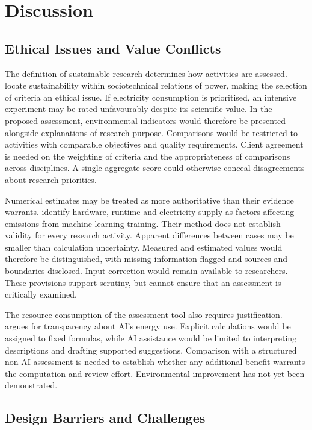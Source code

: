 \documentclass[11pt,a4paper]{article}
\begin{document}
\FloatBarrier
\section{Discussion}

\subsection{Ethical Issues and Value Conflicts}

The definition of sustainable research determines how activities are assessed. \citet{hasselbalch2025sustainability} locate sustainability within sociotechnical relations of power, making the selection of criteria an ethical issue. If electricity consumption is prioritised, an intensive experiment may be rated unfavourably despite its scientific value. In the proposed assessment, environmental indicators would therefore be presented alongside explanations of research purpose. Comparisons would be restricted to activities with comparable objectives and quality requirements. Client agreement is needed on the weighting of criteria and the appropriateness of comparisons across disciplines. A single aggregate score could otherwise conceal disagreements about research priorities.

Numerical estimates may be treated as more authoritative than their evidence warrants. \citet{lacoste2019carbon} identify hardware, runtime and electricity supply as factors affecting emissions from machine learning training. Their method does not establish validity for every research activity. Apparent differences between cases may be smaller than calculation uncertainty. Measured and estimated values would therefore be distinguished, with missing information flagged and sources and boundaries disclosed. Input correction would remain available to researchers. These provisions support scrutiny, but cannot ensure that an assessment is critically examined.

The resource consumption of the assessment tool also requires justification. \citet{lin2023cost} argues for transparency about AI's energy use. Explicit calculations would be assigned to fixed formulas, while AI assistance would be limited to interpreting descriptions and drafting supported suggestions. Comparison with a structured non-AI assessment is needed to establish whether any additional benefit warrants the computation and review effort. Environmental improvement has not yet been demonstrated.

\subsection{Design Barriers and Challenges}
\end{document}

